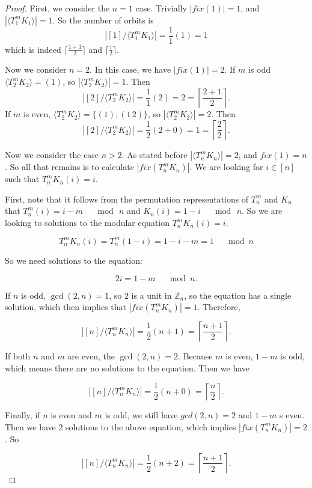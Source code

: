 \documentclass[12pt]{article}
\begin{document}
\begin{proof}
First, we consider the $n = 1$ case. Trivially $|fix(1)| = 1$, and $|\langle T_1^m K_1 \rangle| = 1$. So the number of orbits is $$\left|[1]/\langle T_1^m K_1 \rangle \right|= \frac{1}{1}(1) = 1$$ which is indeed $\lceil \frac{1 + 1}{2} \rceil$ and $\lceil \frac{1}{2}\rceil$. 

Now we consider $n = 2$. In this case, we have $|fix(1)| = 2$. If $m$ is odd $\langle T_2^m K_2 \rangle = (1)$, so $|\langle T_2^m K_2 \rangle| = 1$. Then $$|[2]/\langle T_2^m K_2 \rangle| = \frac{1}{1}(2) = 2 = \left\lceil \frac{2 + 1}{2}\right\rceil.$$ If $m$ is even, $\langle T_2^m K_2 \rangle = \{(1), (1 \, 2) \}$, so $|\langle T_2^m K_2 \rangle| = 2$. Then $$|[2]/\langle T_2^m K_2 \rangle| = \frac{1}{2}(2 + 0) = 1 = \left\lceil \frac{2}{2}\right\rceil.$$

Now we consider the case $n>2$. As stated before $|\langle T_n^m K_n \rangle| = 2$, and $fix(1) = n$. So all that remains is to calculate $|fix(T_n^m K_n)|$. We are looking for $i \in [n]$ such that $T_n^m K_n(i) = i$.

First, note that it follows from the permutation representations of $T_n^m$ and $K_n$ that $T_n^m(i) = i - m \quad \mod \, n$ and $K_n(i) = 1 - i \quad \mod \, n$. So we are looking to solutions to the modular equation $T_n^m K_n(i) = i$.

$$
T_n^m K_n(i) = T_n^m(1 - i) = 1 - i - m = 1 \quad \mod n
$$

So we need solutions to the equation:

\begin{equation}
2i = 1 - m \quad \mod n.
\end{equation}

If $n$ is odd, $\gcd(2, n) = 1$, so $2$ is a unit in $\mathds{Z}_n$, so the equation has a single solution, which then implies that $|fix(T_n^m K_n)|=1$. Therefore, 

$$
\left| [n]/\langle T_n^m K_n \rangle \right| = \frac{1}{2}(n + 1) = \left \lceil \frac{n + 1}{2} \right \rceil.
$$

If both $n$ and $m$ are even, the $\gcd(2, n) = 2$. Because $m$ is even, $1-m$ is odd, which means there are no solutions to the equation. Then we have 

$$
\left| [n]/\langle T_n^m K_n \rangle \right| = \frac{1}{2}(n + 0) = \left \lceil \frac{n}{2} \right \rceil.
$$

Finally, if $n$ is even and $m$ is odd, we still have $gcd(2, n) = 2$ and $1-m$ s even. Then we have $2$ solutions to the above equation, which implies $|fix(T_n^m K_n)| = 2$. So 

$$
\left| [n]/\langle T_n^m K_n \rangle \right| = \frac{1}{2}(n + 2) = \left \lceil \frac{n + 1}{2} \right \rceil.
$$
\end{proof}
\end{document}
